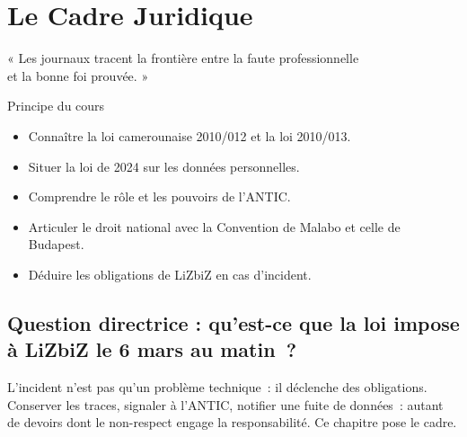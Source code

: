 
\chapter{Le Cadre Juridique}
\label{chap:droit}

\epigraph{%
    « Les journaux tracent la frontière entre la faute professionnelle\\
    et la bonne foi prouvée. »%
}{Principe du cours}


\begin{boxobjectifs}
\begin{itemize}
    \item Connaître la loi camerounaise 2010/012 et la loi 2010/013.
    \item Situer la loi de 2024 sur les données personnelles.
    \item Comprendre le rôle et les pouvoirs de l'ANTIC.
    \item Articuler le droit national avec la Convention de Malabo et celle
          de Budapest.
    \item Déduire les obligations de LiZbiZ en cas d'incident.
\end{itemize}
\end{boxobjectifs}

\bigskip

\section*{Question directrice : qu'est-ce que la loi impose à LiZbiZ le 6 mars au matin~?}

L'incident n'est pas qu'un problème technique~: il déclenche des obligations.
Conserver les traces, signaler à l'ANTIC, notifier une fuite de données~:
autant de devoirs dont le non-respect engage la responsabilité. Ce chapitre
pose le cadre.

